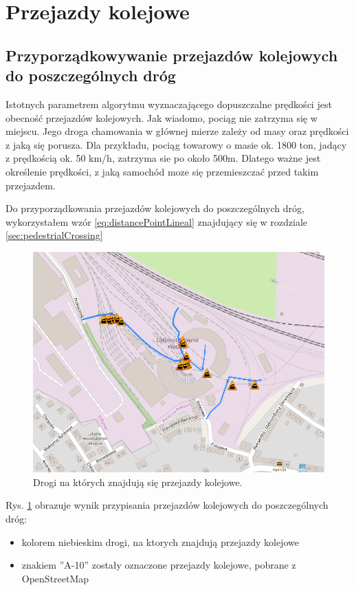 \newpage
\section{Przejazdy kolejowe}
\subsection{Przyporządkowywanie przejazdów kolejowych do poszczególnych dróg}

Istotnych parametrem algorytmu wyznaczającego dopuszczalne prędkości jest obecność przejazdów kolejowych. Jak wiadomo, pociąg nie zatrzyma się w miejscu. Jego droga chamowania w głównej mierze zależy od masy oraz prędkości z jaką się porusza. Dla przykładu, pociąg towarowy o masie ok. 1800 ton, jadący z prędkością ok. 50 km/h, zatrzyma sie po około 500m. Dlatego ważne jest określenie prędkości, z jaką samochód moze się przemieszczać przed takim przejazdem.

Do przyporządkowania przejazdów kolejowych do poszczególnych dróg, wykorzystałem wzór \ref{eq:distancePointLineal} znajdujący się w rozdziale \ref{sec:pedestrialCrossing}


\begin{figure}[h]
\caption{Drogi na których znajdują się przejazdy kolejowe.}
\label{sec:PrzejazdyKolejowe}
\centering
\includegraphics[width=1.0\textwidth]{railCrossing}
\end{figure}

Rys. \ref{sec:PrzejazdyKolejowe} obrazuje wynik przypisania przejazdów kolejowych do poszczególnych dróg:
\begin{itemize}
\item kolorem niebieskim drogi, na ktorych znajdują przejazdy kolejowe
\item znakiem ''A-10'' zostały oznaczone przejazdy kolejowe, pobrane z OpenStreetMap
\end{itemize}

